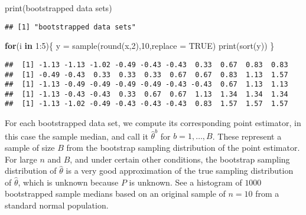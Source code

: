 \documentclass[
]{book}
\newenvironment{Shaded}{\begin{snugshade}}{\end{snugshade}}
\newcommand{\AttributeTok}[1]{\textcolor[rgb]{0.77,0.63,0.00}{#1}}
\newcommand{\ConstantTok}[1]{\textcolor[rgb]{0.00,0.00,0.00}{#1}}
\newcommand{\ControlFlowTok}[1]{\textcolor[rgb]{0.13,0.29,0.53}{\textbf{#1}}}
\newcommand{\DecValTok}[1]{\textcolor[rgb]{0.00,0.00,0.81}{#1}}
\newcommand{\FunctionTok}[1]{\textcolor[rgb]{0.00,0.00,0.00}{#1}}
\newcommand{\NormalTok}[1]{#1}
\newcommand{\OtherTok}[1]{\textcolor[rgb]{0.56,0.35,0.01}{#1}}
\newcommand{\SpecialCharTok}[1]{\textcolor[rgb]{0.00,0.00,0.00}{#1}}
\newcommand{\StringTok}[1]{\textcolor[rgb]{0.31,0.60,0.02}{#1}}
\theoremstyle{definition}
\theoremstyle{definition}
\theoremstyle{definition}
\theoremstyle{definition}
\theoremstyle{remark}
\begin{document}
\begin{Shaded}
\begin{Highlighting}[]
\FunctionTok{print}\NormalTok{(}\StringTok{\textquotesingle{}bootstrapped data sets\textquotesingle{}}\NormalTok{)}
\end{Highlighting}
\end{Shaded}

\begin{verbatim}
## [1] "bootstrapped data sets"
\end{verbatim}

\begin{Shaded}
\begin{Highlighting}[]
\ControlFlowTok{for}\NormalTok{(i }\ControlFlowTok{in} \DecValTok{1}\SpecialCharTok{:}\DecValTok{5}\NormalTok{)\{}
\NormalTok{ y }\OtherTok{=} \FunctionTok{sample}\NormalTok{(}\FunctionTok{round}\NormalTok{(x,}\DecValTok{2}\NormalTok{),}\DecValTok{10}\NormalTok{,}\AttributeTok{replace =} \ConstantTok{TRUE}\NormalTok{)}
 \FunctionTok{print}\NormalTok{(}\FunctionTok{sort}\NormalTok{(y))}
\NormalTok{\}}
\end{Highlighting}
\end{Shaded}

\begin{verbatim}
##  [1] -1.13 -1.13 -1.02 -0.49 -0.43 -0.43  0.33  0.67  0.83  0.83
##  [1] -0.49 -0.43  0.33  0.33  0.33  0.67  0.67  0.83  1.13  1.57
##  [1] -1.13 -0.49 -0.49 -0.49 -0.49 -0.43 -0.43  0.67  1.13  1.13
##  [1] -1.13 -0.43 -0.43  0.33  0.67  0.67  1.13  1.34  1.34  1.34
##  [1] -1.13 -1.02 -0.49 -0.43 -0.43 -0.43  0.83  1.57  1.57  1.57
\end{verbatim}

For each bootstrapped data set, we compute its corresponding point estimator, in this case the sample median, and call it \(\hat\theta^b\) for \(b = 1, \ldots, B\). These represent a sample of size \(B\) from the bootstrap sampling distribution of the point estimator. For large \(n\) and \(B\), and under certain other conditions, the bootstrap sampling distribution of \(\hat\theta\) is a very good approximation of the true sampling distribution of \(\hat\theta\), which is unknown because \(P\) is unknown. See a histogram of \(1000\) bootstrapped sample medians based on an original sample of \(n=10\) from a standard normal population.
\end{document}
